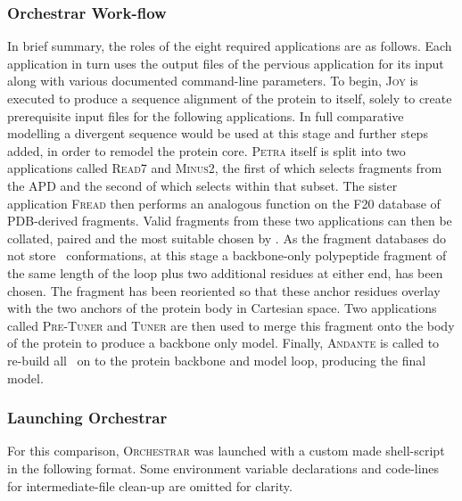 \subsubsection{Orchestrar Work-flow}

In brief summary, the roles of the eight required applications are as follows. Each application in turn uses the output files of the pervious application for its input along with various documented command-line parameters. To begin, \textsc{Joy}\cite{SEQUENCE:JOY} is executed to produce a sequence alignment of the protein to itself, solely to create prerequisite input files for the following applications. In full comparative modelling a divergent sequence would be used at this stage and further steps added, in order to remodel the protein core. \textsc{Petra} itself is split into two applications called \textsc{Read7} and \textsc{Minus2}, the first of which selects fragments from the APD and the second of which selects within that subset. The sister application  \textsc{Fread} then performs an analogous function on the F20 database of PDB-derived fragments. Valid fragments from these two applications can then be collated, paired and the most suitable chosen by \coda. As the fragment databases do not store \sidechain\ conformations, at this stage a backbone-only polypeptide  fragment of the same length of the loop plus two additional residues at either end, has been chosen. The fragment has been reoriented so that these anchor residues overlay with the two anchors of the protein body in Cartesian space. Two applications called \textsc{Pre-Tuner} and \textsc{Tuner} are then used to merge this fragment onto the body of the protein to produce a backbone only model. Finally, \textsc{Andante}\cite{METHOD:ANDANTE} is called to re-build all \sidechains\ on to the protein backbone and model loop, producing the final model.

\subsubsection{Launching Orchestrar}

For this comparison, \textsc{Orchestrar} was launched with a custom made shell-script in the following format. Some environment variable declarations and code-lines for intermediate-file clean-up are omitted for clarity.

